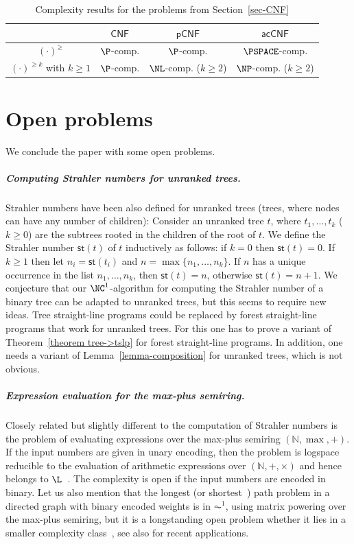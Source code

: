 \documentclass[a4paper,UKenglish,cleveref, autoref, thm-restate, numberwithinsect]{lipics-v2021}
\newcommand{\hs}{\mathsf{st}}
\newcommand{\CNF}{\mathsf{CNF}}
\newcommand{\rCNF}{\mathsf{pCNF}}
\newcommand{\acCNF}{\mathsf{acCNF}}
\begin{document}
\begin{table}[t]
\begin{center}
    \begin{tabular}{c|c|c|c}
             &  $\CNF$             & $\rCNF$            & $\acCNF$ \\ \hline
$(\cdot)^\ge$    & $\P$-comp. & $\P$-comp. & $\PSPACE$-comp.   \\ \hline
$(\cdot)^{\ge k}$ with $k \geq 1$ & $\P$-comp.  & $\NL$-comp.  ($k \geq 2$)  & $\NP$-comp. ($k \geq 2$) \\
    \end{tabular}
  \end{center}
\caption{\label{table-CNF} Complexity results for the problems from Section~\ref{sec-CNF}}
\end{table}


\section{Open problems}

We conclude the paper with some open problems.

\subparagraph{Computing Strahler numbers for unranked trees.}
Strahler numbers have been also defined for unranked trees (trees, where nodes can have any number of children):
Consider an unranked tree $t$, where 
$t_1, \ldots, t_k$ ($k \geq 0$) are the subtrees rooted in the children of the root of $t$.
We define the Strahler number $\hs(t)$ of $t$ inductively
as follows: if $k=0$ then $\hs(t) = 0$. If $k \geq 1$ then let $n_i = \hs(t_i)$ and $n = \max\{n_1, \ldots, n_k\}$.
If $n$ has a unique occurrence in the list $n_1, \ldots, n_k$, then $\hs(t) = n$, otherwise $\hs(t) = n+1$.
We conjecture that our $\NC^1$-algorithm for computing the Strahler number of a binary tree can be adapted
to unranked trees, but this seems to require new ideas.
Tree straight-line programs could be replaced by forest straight-line programs \cite{GasconLMRS20} that work for unranked trees.
For this one has to prove a variant of Theorem~\ref{theorem tree->tslp} for forest straight-line programs. In addition, one needs
a variant of Lemma~\ref{lemma-composition} for unranked trees, which is not obvious.

\subparagraph{Expression evaluation for the max-plus semiring.}
Closely related but slightly different to the computation of Strahler numbers 
is the problem of evaluating expressions over the max-plus semiring $(\mathbb{N},\max,+)$.
If the input numbers are given in unary encoding, then the problem is logspace reducible to the evaluation of arithmetic expressions over $(\mathbb{N},+,\times)$
and hence belongs to $\L$~\cite{JakobyT06}.
The complexity is open if the input numbers are encoded in binary.
Let us also mention that the longest (or shortest~\cite[Lemma~3.3]{JakobyT06}) path problem in a directed graph with binary encoded weights is in $\AC^1$,
using matrix powering over the max-plus semiring,
but it is a longstanding open problem whether it lies in a smaller complexity class~\cite[p.~13]{Cook85}, see also \cite{GanardiSZ24,ShakibaBZ25} for recent applications.
\end{document}
